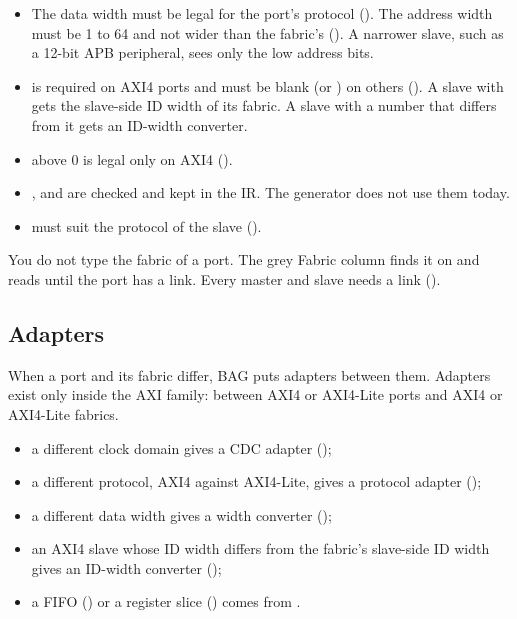 \begin{itemize}
\item The data width must be legal for the port's protocol (). The
  address width must be 1 to 64 and not wider than the fabric's
  (). A narrower slave, such as a 12-bit APB peripheral, sees only
  the low address bits.
\item {} is required on AXI4 ports and must be blank (or
  ) on others (). A slave with  gets the
  slave-side ID width of its fabric. A slave with a number that differs from it gets an
  ID-width converter.
\item {} above 0 is legal only on AXI4 ().
\item {},  and  are
  checked and kept in the IR. The generator does not use them today.
\item {} must suit the protocol of the slave
  ().
\end{itemize}

You do not type the fabric of a port. The grey \textsf{Fabric} column finds it on
 and reads  until the port has a link. Every master
and slave needs a link ().

\subsection{Adapters}

When a port and its fabric differ, BAG puts adapters between them. Adapters exist only
inside the AXI family: between AXI4 or AXI4-Lite ports and AXI4 or AXI4-Lite fabrics.

\begin{itemize}
\item a different clock domain gives a CDC adapter ();
\item a different protocol, AXI4 against AXI4-Lite, gives a protocol adapter
  ();
\item a different data width gives a width converter ();
\item an AXI4 slave whose ID width differs from the fabric's slave-side ID width gives
  an ID-width converter ();
\item a FIFO () or a register slice () comes from
  .
\end{itemize}

